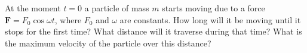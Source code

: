 \item At the moment \( t = 0 \) a particle of mass \( m \) starts moving due to a force \( \mathbf{F} = F_0 \cos \omega t \), where \( F_0 \) and \( \omega \) are constants. How long will it be moving until it stops for the first time? What distance will it traverse during that time? What is the maximum velocity of the particle over this distance?